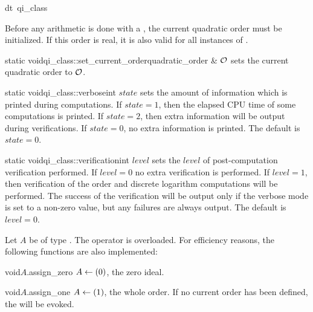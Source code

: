 \begin{fcode}{dt}{~qi_class}{}
\end{fcode}



\INIT

Before any arithmetic is done with a , the current quadratic order must be
initialized.  If this order is real, it is also valid for all instances of .

\begin{fcode}{static void}{qi_class::set_current_order}{quadratic_order & $\mathcal{O}$}
  sets the current quadratic order to $\mathcal{O}$.
\end{fcode}

\begin{fcode}{static void}{qi_class::verbose}{int $\mathit{state}$}
  sets the amount of information which is printed during computations.  If $\mathit{state} = 1$,
  then the elapsed CPU time of some computations is printed.  If $\mathit{state} = 2$, then
  extra information will be output during verifications.  If $\mathit{state} = 0$, no extra
  information is printed.  The default is $\mathit{state} = 0$.
\end{fcode}

\begin{fcode}{static void}{qi_class::verification}{int $\mathit{level}$}
  sets the $\mathit{level}$ of post-computation verification performed.  If $\mathit{level} = 0$
  no extra verification is performed.  If $\mathit{level} = 1$, then verification of the order
  and discrete logarithm computations will be performed.  The success of the verification will
  be output only if the verbose mode is set to a non-zero value, but any failures are always
  output.  The default is $\mathit{level} = 0$.
\end{fcode}



\ASGN

Let $A$ be of type .  The operator \code{=} is overloaded.  For efficiency
reasons, the following functions are also implemented:

\begin{fcode}{void}{$A$.assign_zero}{}
  $A \leftarrow (0)$, the zero ideal.
\end{fcode}

\begin{fcode}{void}{$A$.assign_one}{}
  $A \leftarrow (1)$, the whole order.  If no current order has been defined, the \LEH will be
  evoked.
\end{fcode}

